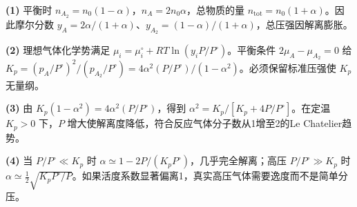 \par\noindent\textbf{(1)} 平衡时 \(n_{A_2}=n_0(1-\alpha)\)，\(n_A=2n_0\alpha\)，总物质的量 \(n_{\mathrm{tot}}=n_0(1+\alpha)\)。因此摩尔分数 \(y_A=2\alpha/(1+\alpha)\)、\(y_{A_2}=(1-\alpha)/(1+\alpha)\)，总压强因解离膨胀。
\par\noindent\textbf{(2)} 理想气体化学势满足 \(\mu_i=\mu_i^\circ+RT\ln(y_iP/P^\circ)\)。平衡条件 \(2\mu_A-\mu_{A_2}=0\) 给 \(K_p=(p_A/P^\circ)^2/(p_{A_2}/P^\circ)=4\alpha^2(P/P^\circ)/(1-\alpha^2)\)。必须保留标准压强使 \(K_p\) 无量纲。
\par\noindent\textbf{(3)} 由 \(K_p(1-\alpha^2)=4\alpha^2(P/P^\circ)\)，得到 \(\alpha^2=K_p/[K_p+4P/P^\circ]\)。在定温 \(K_p>0\) 下，\(P\) 增大使解离度降低，符合反应气体分子数从1增至2的Le Chatelier趋势。
\par\noindent\textbf{(4)} 当 \(P/P^\circ\ll K_p\) 时 \(\alpha\simeq1-2P/(K_pP^\circ)\)，几乎完全解离；高压 \(P/P^\circ\gg K_p\) 时 \(\alpha\simeq\tfrac12\sqrt{K_pP^\circ/P}\)。如果活度系数显著偏离1，真实高压气体需要逸度而不是简单分压。
